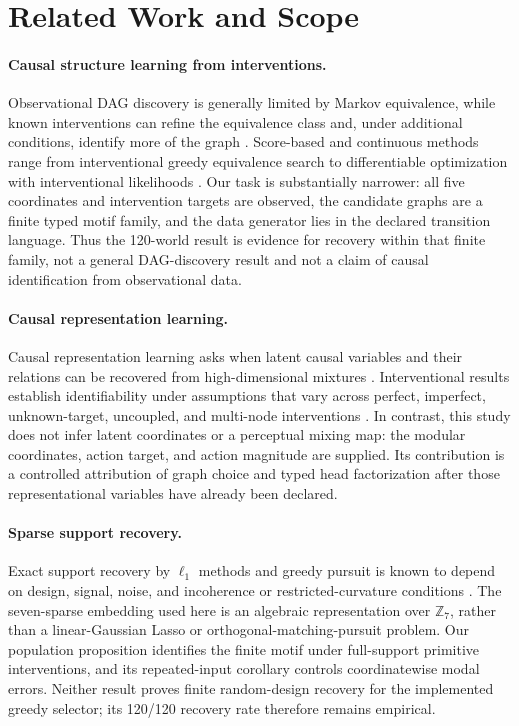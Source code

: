 \section{Related Work and Scope}

\paragraph{Causal structure learning from interventions.}
Observational DAG discovery is generally limited by Markov equivalence, while
known interventions can refine the equivalence class and, under additional
conditions, identify more of the graph
\citep{hauser2012interventional,yang2018interventions}.  Score-based and
continuous methods range from interventional greedy equivalence search to
differentiable optimization with interventional likelihoods
\citep{zheng2018notears,brouillard2020dcdi}.  Our task is substantially
narrower: all five coordinates and intervention targets are observed, the
candidate graphs are a finite typed motif family, and the data generator lies
in the declared transition language.  Thus the 120-world result is evidence
for recovery within that finite family, not a general DAG-discovery result and
not a claim of causal identification from observational data.

\paragraph{Causal representation learning.}
Causal representation learning asks when latent causal variables and their
relations can be recovered from high-dimensional mixtures
\citep{scholkopf2021causalrep}.  Interventional results establish
identifiability under assumptions that vary across perfect, imperfect,
unknown-target, uncoupled, and multi-node interventions
\citep{ahuja2023interventional,vonkugelgen2023nonparametric,
bing2024multinode,varici2024general}.  In contrast, this study does not infer
latent coordinates or a perceptual mixing map: the modular coordinates,
action target, and action magnitude are supplied.  Its contribution is a
controlled attribution of graph choice and typed head factorization after
those representational variables have already been declared.

\paragraph{Sparse support recovery.}
Exact support recovery by $\ell_1$ methods and greedy pursuit is known to
depend on design, signal, noise, and incoherence or restricted-curvature
conditions \citep{tropp2007omp,wainwright2009sharp,
dyer2013greedy,bahmani2013grasp}.  The seven-sparse embedding used here is an
algebraic representation over $\mathbb Z_7$, rather than a linear-Gaussian
Lasso or orthogonal-matching-pursuit problem.  Our population proposition
identifies the finite motif under full-support primitive interventions, and
its repeated-input corollary controls coordinatewise modal errors.  Neither
result proves finite random-design recovery for the implemented greedy
selector; its 120/120 recovery rate therefore remains empirical.

